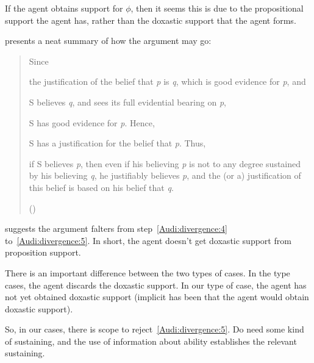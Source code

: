 \begin{note}
  If the agent obtains support for \(\phi\), then it seems this is due to the propositional support the agent has, rather than the doxastic support that the agent forms.
\end{note}

\begin{note}
  \citeauthor{Audi:1983ux} presents a neat summary of how the argument may go:
  \begin{quote}
    Since
    \begin{enumerate*}[label=(\arabic*)]
    \item\label{Audi:divergence:1} the justification of the belief that \emph{p} is \emph{q}, which is good evidence for \emph{p}, and
    \item\label{Audi:divergence:2} S believes \emph{q}, and sees its full evidential bearing on \emph{p},
    \item\label{Audi:divergence:3} S has good evidence for \emph{p}.
      Hence,
    \item\label{Audi:divergence:4} S has a justification for the belief that \emph{p}.
      Thus,
    \item\label{Audi:divergence:5} if S believes \emph{p}, then even if his believing \emph{p} is not to any degree sustained by his believing \emph{q}, he justifiably believes \emph{p}, and the (or a) justification of this belief is based on his belief that \emph{q}.
    \end{enumerate*}
    \nolinebreak
    \mbox{}\hfill\mbox{(\citeauthor[406]{Audi:1983ux})}
  \end{quote}
  \citeauthor{Audi:1983ux} suggests the argument falters from step~\ref{Audi:divergence:4} to~\ref{Audi:divergence:5}.
  In short, the agent doesn't get doxastic support from proposition support.
\end{note}

\begin{note}
  There is an important difference between the two types of cases.
  In the \citeauthor{Lehrer:1971aa} type cases, the agent discards the doxastic support.
  In our type of case, the agent has not yet obtained doxastic support (implicit has been that the agent would obtain doxastic support).

  So, in our cases, there is scope to reject~\ref{Audi:divergence:5}.
  Do need some kind of sustaining, and the use of information about ability establishes the relevant sustaining.
\end{note}

